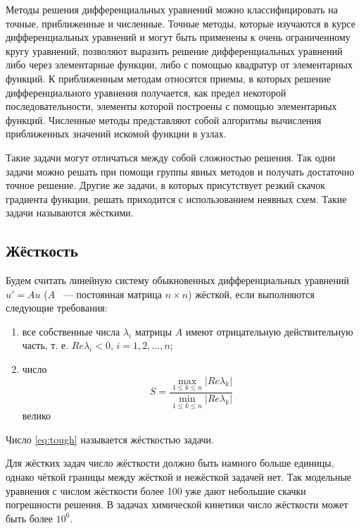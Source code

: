 Методы решения дифференциальных уравнений можно классифицировать на точные, приближенные и численные. Точные методы, которые изучаются
в курсе дифференциальных уравнений и могут быть применены к очень ограниченному кругу уравнений, позволяют выразить решение
дифференциальных уравнений либо через элементарные функции, либо с помощью квадратур от элементарных функций. К приближенным методам
относятся приемы, в которых решение дифференциального уравнения получается, как предел некоторой последовательности, элементы которой
построены с помощью элементарных функций. Численные методы представляют собой алгоритмы вычисления приближенных значений искомой
функции в узлах. %

Такие задачи могут отличаться между собой сложностью решения. Так одни задачи можно решать при помощи группы явных методов и получать
достаточно точное решение. Другие же задачи, в которых присутствует резкий скачок градиента функции, решать приходится с использованием
неявных схем. Такие задачи называются жёсткими.

\subsection{Жёсткость}

Будем считать линейную систему обыкновенных дифференциальных уравнений $u' = Au$ ($A$ ~--- постоянная матрица $n \times n$)
жёсткой, если выполняются следующие требования:

\begin{enumerate}
    \item все собственные числа $\lambda_i$ матрицы $A$ имеют отрицательную действительную часть, т. е. $Re\lambda_i < 0$, 
    $i = 1, 2, ..., n$;
    \item число
        \begin{equation}
            S = \dfrac{\max\limits_{1 \leq k \leq n}|Re\lambda_k|}{\min\limits_{1 \leq k \leq n}|Re\lambda_k|}
            \label{eq:tough}
        \end{equation}
        велико
\end{enumerate}

Число \ref{eq:tough} называется жёсткостью задачи.

Для жёстких задач число жёсткости должно быть намного больше единицы, однако чёткой границы между жёсткой и нежёсткой задачей нет. Так
модельные уравнения с числом жёсткости более 100 уже дают небольшие скачки погрешности решения. В задачах химической кинетики число
жёсткости может быть более $10^6$.

